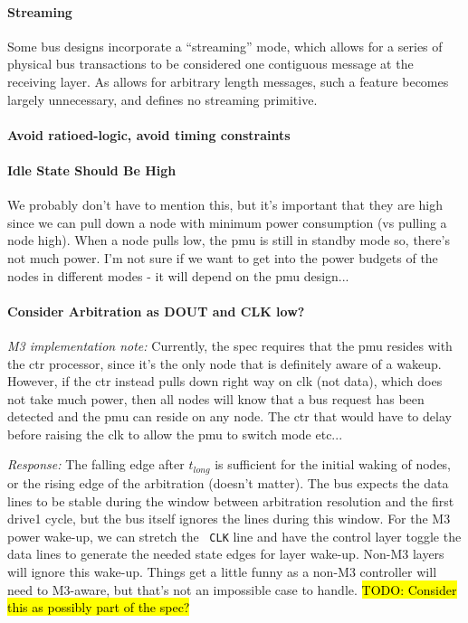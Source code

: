 \paragraph{Streaming}
Some bus designs incorporate a ``streaming'' mode, which allows for a series
of physical bus transactions to be considered one contiguous message at the
receiving layer. As \bus allows for arbitrary length messages, such a feature
becomes largely unnecessary, and \bus defines no streaming primitive.

\paragraph{Avoid ratioed-logic, avoid timing constraints}

\paragraph{Idle State Should Be High}
We probably don't have to mention this, but it's important that they are high
since we can pull down a node with minimum power consumption (vs pulling a
node high). When a node pulls low, the pmu is still in standby mode so,
there's not much power.  I'm not sure if we want to get into the power budgets
of the nodes in different modes - it will depend on the pmu design...

\paragraph{Consider Arbitration as DOUT and CLK low?}
\label{todo:wakeup}
{\em M3 implementation note:} Currently, the spec
requires that the pmu resides with the ctr processor, since it's the only node
that is definitely aware of a wakeup.  However, if the ctr instead pulls down
right way on clk (not data), which does not take much power, then all nodes
will know that a bus request has been detected and the pmu can reside on any
node.  The ctr that would have to delay before raising the clk to allow the
pmu to switch mode etc...

{\em Response:} The falling edge after $t_{long}$ is sufficient for the
initial waking of nodes, or the rising edge of the arbitration (doesn't
matter). The bus expects the data lines to be stable during the window between
arbitration resolution and the first {\sc drive1} cycle, but the bus itself
ignores the lines during this window. For the M3 power wake-up, we can stretch
the \bus~{\tt CLK} line and have the control layer toggle the data lines to
generate the needed state edges for layer wake-up. Non-M3 layers will ignore
this wake-up. Things get a little funny as a non-M3 controller will need to
M3-aware, but that's not an impossible case to handle. \hl{TODO: Consider this
as possibly part of the spec?}


